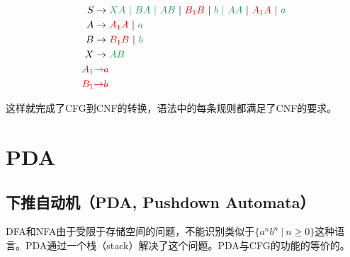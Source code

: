 \vspace{-1cm}

\begin{align*}
    S                    & \rightarrow \textcolor{ForestGreen}{XA\ |\ BA\ |\ AB}\ |\ \textcolor{red}{B_1B}\ |\ \textcolor{ForestGreen}{b\ |\ AA}\ |\ \textcolor{red}{A_1A}\ |\ \textcolor{ForestGreen}{a} \\
    A                    & \rightarrow \textcolor{red}{A_1A}\ |\ \textcolor{ForestGreen}{a}                                                                                                               \\
    B                    & \rightarrow \textcolor{red}{B_1B}\ |\ \textcolor{ForestGreen}{b}                                                                                                               \\
    X                    & \rightarrow \textcolor{ForestGreen}{AB}                                                                                                                                        \\
    \textcolor{red}{A_1} & \textcolor{red}{\rightarrow} \textcolor{red}{a}                                                                                                                                \\
    \textcolor{red}{B_1} & \textcolor{red}{\rightarrow} \textcolor{red}{b}
\end{align*}

这样就完成了CFG到CNF的转换，语法中的每条规则都满足了CNF的要求。

\newpage

\section{PDA}

\subsection{下推自动机（PDA, Pushdown Automata）}

DFA和NFA由于受限于存储空间的问题，不能识别类似于$ \{a^nb^n\ |\ n \ge 0\} $这种语言。PDA通过一个栈（stack）解决了这个问题。PDA与CFG的功能的等价的。\\

